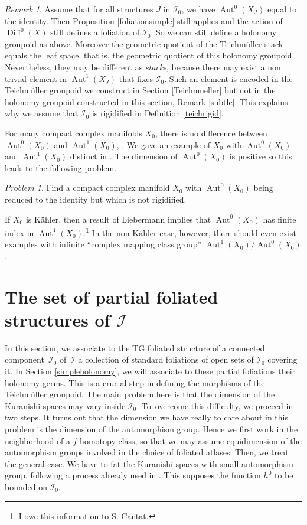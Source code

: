 \documentclass[10pt]{amsart}
\let\mathcal\mathscr
\DeclareMathOperator{\Aut}{Aut}
\DeclareMathOperator{\Diff}{Diff}
\theoremstyle{plain}
\theoremstyle{definition}
\theoremstyle{remark}
\newtheorem{remark}[theorem]{Remark}
\newtheorem{problem}[theorem]{Problem}
\numberwithin{equation}{section}
\newcommand{\Azero}{\Aut^0(X_0)}
\newcommand{\Aun}{\Aut^1(X_0)}
\newcommand{\cI}{\mathcal{I}}
\begin{document}
\begin{remark}
\label{Aut10bis}
Assume that for all structures $J$ in $\cI_0$, we have $\Aut^0(X_J)$ equal to the identity. Then Proposition \ref{foliationsimple} still applies and the action of $\Diff^0(X)$ still defines a foliation of $\cI_0$. So we can still define a holonomy groupoid as above. Moreover the geometric quotient of the Teichmüller stack equals the leaf space, that is, the geometric quotient of this holonomy groupoid. Nevertheless, they may be different as \emph{stacks}, because there may exist a non trivial element in $\Aut^1(X_J)$ that fixes $\cI_0$. Such an element is encoded in the Teichmüller groupoid we construct in Section \ref{Teichmueller} but not in the holonomy groupoid constructed in this section, \cf Remark \ref{subtle}. This explains why we assume that $\cI_0$ is rigidified in Definition \ref{teichrigid}.

For many compact complex manifolds $X_0$, there is no difference between $\Aut^0(X_0)$ and $\Aut^1(X_0)$, \cf \cite{Catsurvey}. We gave an example of $X_0$ with $\Azero$ and $\Aun$ distinct in \cite{Aut1paper}. The dimension of $\Azero$ is positive so this leads to the following problem.

\begin{problem}
Find a compact complex manifold $X_0$ with $\Aut^0(X_0)$ being reduced to the identity but which is not rigidified.
\end{problem}

If $X_0$ is Kähler, then a result of Liebermann implies that $\Aut^0(X_0)$ has finite index in $\Aut^1(X_0)$.\footnote{I owe this information to S. Cantat.} In the non-Kähler case, however, there should even exist examples with infinite ``complex mapping class group'' $\Aut^1(X_0)/\Aut^0(X_0)$.
\end{remark}

\section{The set of partial foliated structures of \texorpdfstring{$\cI$}{I}}
\label{multifoliate}

In this section, we associate to the TG foliated structure of a connected component~$\cI_0$ of~$\cI$ a collection of standard foliations of open sets of $\cI_0$ covering it. In Section \ref{simpleholonomy}, we will associate to these partial foliations their holonomy germs. This is a crucial step in defining the morphisms of the Teichmüller groupoid. The main problem here is that the dimension of the Kuranishi spaces may vary inside $\cI_0$. To~overcome this difficulty, we proceed in two steps. It turns out that the dimension we have really to care about in this problem is the dimension of the automorphism group. Hence we first work in the neighborhood of a $f$-homotopy class, so that we may assume equidimension of the automorphism groups involved in the choice of foliated atlases. Then, we treat the general case. We have to fat the Kuranishi spaces with small automorphism group, following a process already used in \cite{circle}. This supposes the function $h^0$ to be bounded on $\cI_0$.
\end{document}
